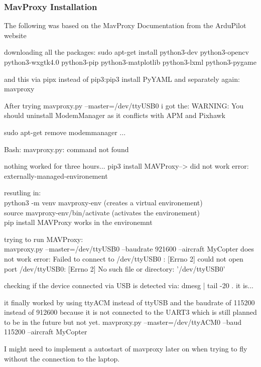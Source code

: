 \documentclass{article}
\begin{document}
	\subsubsection{MavProxy Installation}
	The following was based on the MavProxy Documentation \cite{MavProxydocs} from the ArduPilot website
	
	downloading all the packages: sudo apt-get install python3-dev python3-opencv python3-wxgtk4.0 python3-pip python3-matplotlib python3-lxml python3-pygame
	
	and this via pipx instead of pip3:pip3 install PyYAML
	and separately again: mavproxy
	
	After trying mavproxy.py --master=/dev/ttyUSB0 i got the:
	WARNING: You should uninstall ModemManager as it conflicts with APM and Pixhawk
	
	sudo apt-get remove modemmanager ...
	
	Bash: mavproxy.py: command not found
	
	nothing worked for three hours...
	pip3 install MAVProxy--> did not work error: externally-managed-environement
	
	
	resutling in:
	\\python3 -m venv mavproxy-env (creates a virtual environement)
	\\source mavproxy-env/bin/activate (activates the environement)
	\\pip install MAVProxy works in the environemnt
	
	trying to run MAVProxy:
	\\ mavproxy.py --master=/dev/ttyUSB0 --baudrate 921600 --aircraft MyCopter does not work error: Failed to connect to /dev/ttyUSB0 : [Errno 2] could not open port /dev/ttyUSB0: [Errno 2] No such file or directory: '/dev/ttyUSB0'
	
	checking if the device connected via USB is detected via: dmesg | tail -20 . it is...
	

	
	it finally worked by using ttyACM instead of ttyUSB and the baudrate of 115200 instead of 912600 because it is not connected to the UART3 which is still planned to be in the future but not yet. 
	mavproxy.py --master=/dev/ttyACM0 --baud 115200 --aircraft MyCopter
	
	I might need to implement a autostart of mavproxy later on when trying to fly without the connection to the laptop.
	
\end{document}
